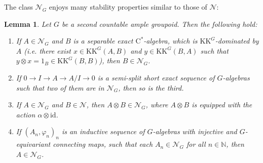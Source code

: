 \documentclass[reqno,oneside,a4paper,11pt]{amsart}
\theoremstyle{theorem}
\newtheorem{lemma}[satz]{Lemma}
\theoremstyle{definition}
\newcommand{\KK}{\mathrm{KK}}
\newcommand{\NN}{\mathbb N}
\newcommand{\id}{\text{id}}
\begin{document}
	The class $\mathcal{N}_G$ enjoys many stability properties similar to those of $\mathcal{N}$:
	\begin{lemma}\label{Lemma:Stability Properties of N_G}
		Let $G$ be a second countable ample groupoid. Then the following hold:
		\begin{enumerate}
			\item If $A\in\mathcal{N}_G$ and $B$ is a separable exact $\mathrm{C}^*$-algebra, which is $\KK^G$-dominated by $A$ (i.e. there exist $x\in\KK^G(A,B)$ and $y\in \KK^G(B,A)$ such that $y\otimes x=1_B\in \KK^G(B,B)$), then $B\in\mathcal{N}_G$.
			\item If $0\rightarrow I\rightarrow A\rightarrow A/I\rightarrow 0$ is a semi-split short exact sequence of $G$-algebras such that two of them are in $\mathcal{N}_G$, then so is the third.
			\item If $A\in\mathcal{N}_G$ and $B\in\mathcal{N}$, then $A\otimes B\in\mathcal{N}_G$, where $A\otimes B$ is equipped with the action $\alpha\otimes\id$.
			\item If $(A_n,\varphi_n)_n$ is an inductive sequence of $G$-algebras with injective and $G$-equivariant connecting maps, such that each $A_n\in\mathcal{N}_G$ for all $n\in\NN$, then $A\in\mathcal{N}_G$.
		\end{enumerate}
	\end{lemma}
\end{document}
